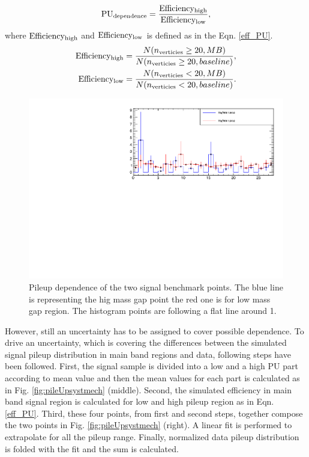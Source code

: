 \begin{equation}
{\rm PU_{dependence}}= \frac{{\rm Efficiency_{high}} }{{\rm Efficiency_{low}} },
\end{equation}
where $\rm Efficiency_{high}$ and $\rm Efficiency_{low}$ is defined as in the Eqn. \ref{eff_PU}.
\begin{eqnarray}
\label{eff_PU}
{\rm Efficiency_{high}} = \frac{N(n_{\rm verticies}\geq20, MB)}{N(n_{\rm verticies}\geq20, baseline)},\\
{\rm Efficiency_{low}} = \frac{N(n_{\rm verticies}<20, MB)}{N(n_{\rm verticies}<20, baseline)}.
\end{eqnarray}
\begin{figure}[!hbt]
    \begin{center}
 \includegraphics[width=0.8 \textwidth]{Plots/analysis/pileUp/PU_dependence}
  \caption{ \label{fig:pileUpdependence} Pileup dependence of the two signal benchmark points. The blue line is representing the hig mass gap point the red one is for low mass gap region. The histogram points are following a flat line around 1.}
  \end{center}
\end{figure}
However, still an uncertainty has to be assigned to cover possible dependence. 
To drive an uncertainty, which is covering the differences between the simulated signal pileup distribution in main band regions and data, following steps have been followed. First, the signal sample is divided into a low and a high PU part according to mean value and then the mean values for each part is calculated as in Fig. \ref{fig:pileUpsystmech} (middle).
Second, the simulated efficiency in main band signal region is calculated for low and high pileup region as in Eqn. \ref{eff_PU}. Third, these four points, from first and second steps, together compose the two points in Fig. \ref{fig:pileUpsystmech} (right). A linear fit is performed to extrapolate for all the pileup range. Finally, normalized data pileup distribution is folded with the fit and the sum is calculated. 
